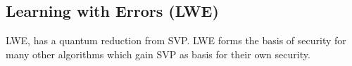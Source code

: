 \subsection{Learning with Errors (LWE)}

LWE, has a quantum reduction from SVP. LWE forms the basis of security for many other algorithms which gain SVP as basis for their own security.